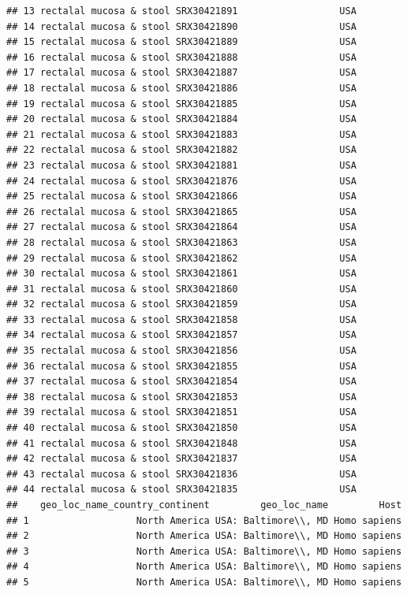 \documentclass[
]{article}
\begin{document}
\begin{verbatim}
## 13 rectalal mucosa & stool SRX30421891                  USA
## 14 rectalal mucosa & stool SRX30421890                  USA
## 15 rectalal mucosa & stool SRX30421889                  USA
## 16 rectalal mucosa & stool SRX30421888                  USA
## 17 rectalal mucosa & stool SRX30421887                  USA
## 18 rectalal mucosa & stool SRX30421886                  USA
## 19 rectalal mucosa & stool SRX30421885                  USA
## 20 rectalal mucosa & stool SRX30421884                  USA
## 21 rectalal mucosa & stool SRX30421883                  USA
## 22 rectalal mucosa & stool SRX30421882                  USA
## 23 rectalal mucosa & stool SRX30421881                  USA
## 24 rectalal mucosa & stool SRX30421876                  USA
## 25 rectalal mucosa & stool SRX30421866                  USA
## 26 rectalal mucosa & stool SRX30421865                  USA
## 27 rectalal mucosa & stool SRX30421864                  USA
## 28 rectalal mucosa & stool SRX30421863                  USA
## 29 rectalal mucosa & stool SRX30421862                  USA
## 30 rectalal mucosa & stool SRX30421861                  USA
## 31 rectalal mucosa & stool SRX30421860                  USA
## 32 rectalal mucosa & stool SRX30421859                  USA
## 33 rectalal mucosa & stool SRX30421858                  USA
## 34 rectalal mucosa & stool SRX30421857                  USA
## 35 rectalal mucosa & stool SRX30421856                  USA
## 36 rectalal mucosa & stool SRX30421855                  USA
## 37 rectalal mucosa & stool SRX30421854                  USA
## 38 rectalal mucosa & stool SRX30421853                  USA
## 39 rectalal mucosa & stool SRX30421851                  USA
## 40 rectalal mucosa & stool SRX30421850                  USA
## 41 rectalal mucosa & stool SRX30421848                  USA
## 42 rectalal mucosa & stool SRX30421837                  USA
## 43 rectalal mucosa & stool SRX30421836                  USA
## 44 rectalal mucosa & stool SRX30421835                  USA
##    geo_loc_name_country_continent         geo_loc_name         Host
## 1                   North America USA: Baltimore\\, MD Homo sapiens
## 2                   North America USA: Baltimore\\, MD Homo sapiens
## 3                   North America USA: Baltimore\\, MD Homo sapiens
## 4                   North America USA: Baltimore\\, MD Homo sapiens
## 5                   North America USA: Baltimore\\, MD Homo sapiens

\end{verbatim}
\end{document}

